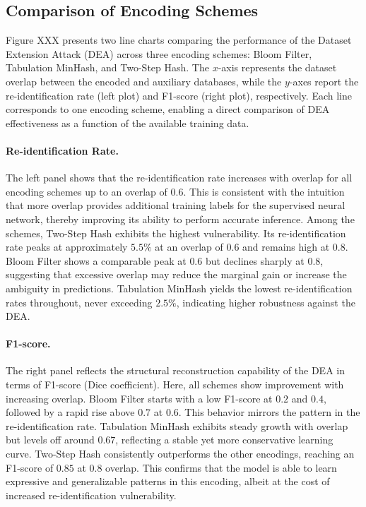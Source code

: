 \subsection{Comparison of Encoding Schemes}

Figure XXX presents two line charts comparing the performance of the Dataset Extension Attack (DEA) across three encoding schemes: Bloom Filter, Tabulation MinHash, and Two-Step Hash. The $x$-axis represents the dataset overlap between the encoded and auxiliary databases, while the $y$-axes report the re-identification rate (left plot) and F1-score (right plot), respectively. Each line corresponds to one encoding scheme, enabling a direct comparison of DEA effectiveness as a function of the available training data.

\paragraph{Re-identification Rate.} The left panel shows that the re-identification rate increases with overlap for all encoding schemes up to an overlap of $0.6$. This is consistent with the intuition that more overlap provides additional training labels for the supervised neural network, thereby improving its ability to perform accurate inference. Among the schemes, Two-Step Hash exhibits the highest vulnerability. Its re-identification rate peaks at approximately $5.5\%$ at an overlap of $0.6$ and remains high at $0.8$. Bloom Filter shows a comparable peak at $0.6$ but declines sharply at $0.8$, suggesting that excessive overlap may reduce the marginal gain or increase the ambiguity in predictions. Tabulation MinHash yields the lowest re-identification rates throughout, never exceeding $2.5\%$, indicating higher robustness against the DEA.

\paragraph{F1-score.} The right panel reflects the structural reconstruction capability of the DEA in terms of F1-score (Dice coefficient). Here, all schemes show improvement with increasing overlap. Bloom Filter starts with a low F1-score at $0.2$ and $0.4$, followed by a rapid rise above $0.7$ at $0.6$. This behavior mirrors the pattern in the re-identification rate. Tabulation MinHash exhibits steady growth with overlap but levels off around $0.67$, reflecting a stable yet more conservative learning curve. Two-Step Hash consistently outperforms the other encodings, reaching an F1-score of $0.85$ at $0.8$ overlap. This confirms that the model is able to learn expressive and generalizable patterns in this encoding, albeit at the cost of increased re-identification vulnerability.

